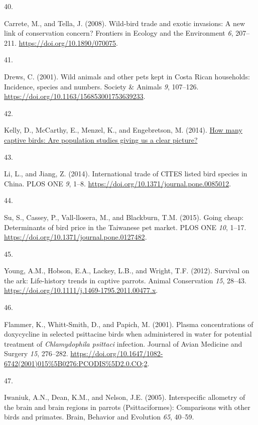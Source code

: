 \documentclass[
  man, donotrepeattitle,floatsintext]{apa6}
\newlength{\cslhangindent}
\newlength{\csllabelwidth}
\newlength{\cslentryspacingunit} %
\newenvironment{CSLReferences}[2] %
 {%
  \setlength{\parindent}{0pt}
  \ifodd #1
  \let\oldpar\par
  \def\par{\hangindent=\cslhangindent\oldpar}
  \fi
  \setlength{\parskip}{#2\cslentryspacingunit}
 }%
 {}
\newcommand{\CSLLeftMargin}[1]{\parbox[t]{\csllabelwidth}{#1}}
\newcommand{\CSLRightInline}[1]{\parbox[t]{\linewidth - \csllabelwidth}{#1}\break}
\begin{document}
\begin{CSLReferences}{0}{0}
\leavevmode{}%
\CSLLeftMargin{40. }%
\CSLRightInline{Carrete, M., and Tella, J. (2008). Wild-bird trade and exotic invasions: A new link of conservation concern? Frontiers in Ecology and the Environment \emph{6}, 207--211. \url{https://doi.org/10.1890/070075}.}

\leavevmode{}%
\CSLLeftMargin{41. }%
\CSLRightInline{Drews, C. (2001). Wild animals and other pets kept in {C}osta {R}ican households: Incidence, species and numbers. Society \& Animals \emph{9}, 107--126. \url{https://doi.org/10.1163/156853001753639233}.}

\leavevmode{}%
\CSLLeftMargin{42. }%
\CSLRightInline{Kelly, D., McCarthy, E., Menzel, K., and Engebretson, M. (2014). \href{https://www.avianwelfare.org/issues/overview.htm}{How many captive birds: Are population studies giving us a clear picture?}}

\leavevmode{}%
\CSLLeftMargin{43. }%
\CSLRightInline{Li, L., and Jiang, Z. (2014). International trade of {CITES} listed bird species in {C}hina. PLOS ONE \emph{9}, 1--8. \url{https://doi.org/10.1371/journal.pone.0085012}.}

\leavevmode{}%
\CSLLeftMargin{44. }%
\CSLRightInline{Su, S., Cassey, P., Vall-llosera, M., and Blackburn, T.M. (2015). Going cheap: Determinants of bird price in the {T}aiwanese pet market. PLOS ONE \emph{10}, 1--17. \url{https://doi.org/10.1371/journal.pone.0127482}.}

\leavevmode{}%
\CSLLeftMargin{45. }%
\CSLRightInline{Young, A.M., Hobson, E.A., Lackey, L.B., and Wright, T.F. (2012). Survival on the ark: Life-history trends in captive parrots. Animal Conservation \emph{15}, 28--43. \url{https://doi.org/10.1111/j.1469-1795.2011.00477.x}.}

\leavevmode{}%
\CSLLeftMargin{46. }%
\CSLRightInline{Flammer, K., Whitt-Smith, D., and Papich, M. (2001). Plasma concentrations of doxycycline in selected psittacine birds when administered in water for potential treatment of \emph{{C}hlamydophila psittaci} infection. Journal of Avian Medicine and Surgery \emph{15}, 276--282. \url{https://doi.org/10.1647/1082-6742(2001)015\%5B0276:PCODIS\%5D2.0.CO;2}.}

\leavevmode{}%
\CSLLeftMargin{47. }%
\CSLRightInline{Iwaniuk, A.N., Dean, K.M., and Nelson, J.E. (2005). Interspecific allometry of the brain and brain regions in parrots ({P}sittaciformes): Comparisons with other birds and primates. Brain, Behavior and Evolution \emph{65}, 40--59.}


\end{CSLReferences}
\end{document}
